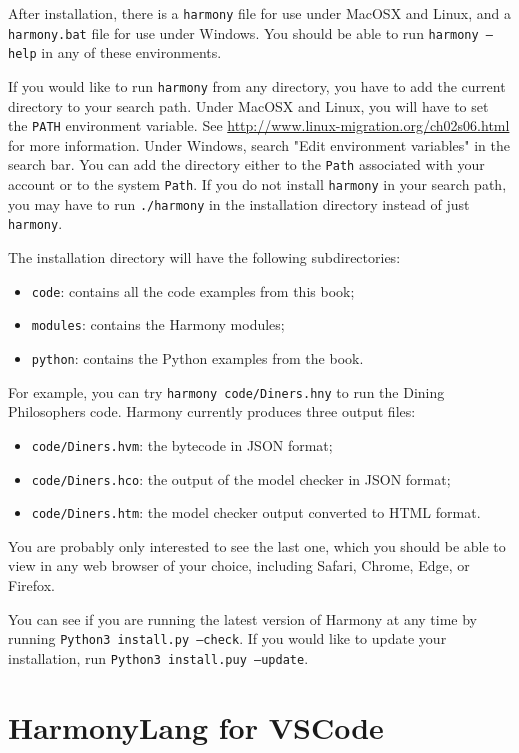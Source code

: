 \documentclass{report}
\begin{document}
After installation, there is a \texttt{harmony} file for use under
MacOSX and Linux, and a \texttt{harmony.bat} file for use under Windows.
You should be able to run \texttt{harmony --help} in any of these
environments.

If you would like to run \texttt{harmony} from any directory, you have to
add the current directory to your search path.  Under MacOSX and Linux,
you will have to set the \texttt{PATH} environment variable.
See \url{http://www.linux-migration.org/ch02s06.html} for more information.
Under Windows, search "Edit environment variables" in the search bar.
You can add the directory either to the \texttt{Path} associated with
your account or to the system \texttt{Path}.
If you do not install \texttt{harmony} in your search path, you may have
to run \texttt{./harmony} in the installation directory instead of
just \texttt{harmony}.

The installation directory will have the following subdirectories:

\begin{itemize}
\item \texttt{code}: contains all the code examples from this book;
\item \texttt{modules}: contains the Harmony modules;
\item \texttt{python}: contains the Python examples from the book.
\end{itemize}

For example, you can try \texttt{harmony code/Diners.hny} to run the
Dining Philosophers code.
Harmony currently produces three output files:
\begin{itemize}
\item \texttt{code/Diners.hvm}: the bytecode in JSON format;
\item \texttt{code/Diners.hco}: the output of the model checker in JSON format;
\item \texttt{code/Diners.htm}: the model checker output converted to HTML format.
\end{itemize}

You are probably only interested to see the last one, which you should be
able to view in any web browser of your choice, including Safari, Chrome, Edge, or Firefox.

You can see if you are running the latest version of Harmony at any
time by running \texttt{Python3 install.py --check}.  If you would like
to update your installation, run \texttt{Python3 install.puy --update}.

\section{HarmonyLang for VSCode}
\end{document}
